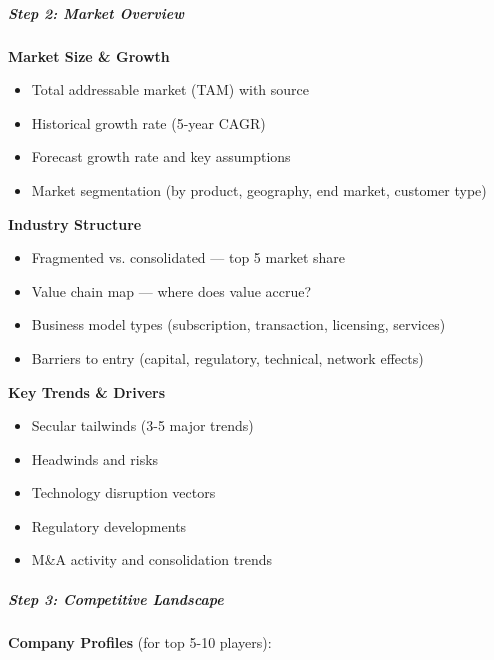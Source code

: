 \documentclass[11pt]{article}
\begin{document}
\subparagraph{Step 2: Market Overview}\mbox{}\par

\textbf{Market Size \& Growth}

\begin{itemize}[leftmargin=*,itemsep=2pt,topsep=2pt]
\item {} Total addressable market (TAM) with source
\item {} Historical growth rate (5-year CAGR)
\item {} Forecast growth rate and key assumptions
\item {} Market segmentation (by product, geography, end market, customer type)
\end{itemize}

\textbf{Industry Structure}

\begin{itemize}[leftmargin=*,itemsep=2pt,topsep=2pt]
\item {} Fragmented vs. consolidated — top 5 market share
\item {} Value chain map — where does value accrue?
\item {} Business model types (subscription, transaction, licensing, services)
\item {} Barriers to entry (capital, regulatory, technical, network effects)
\end{itemize}

\textbf{Key Trends \& Drivers}

\begin{itemize}[leftmargin=*,itemsep=2pt,topsep=2pt]
\item {} Secular tailwinds (3-5 major trends)
\item {} Headwinds and risks
\item {} Technology disruption vectors
\item {} Regulatory developments
\item {} M\&A activity and consolidation trends
\end{itemize}

\subparagraph{Step 3: Competitive Landscape}\mbox{}\par

\textbf{Company Profiles} (for top 5-10 players):
\end{document}

